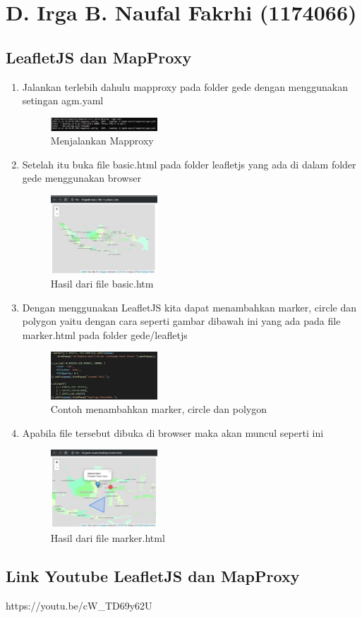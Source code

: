 \section{D. Irga B. Naufal Fakrhi (1174066)}
\subsection{LeafletJS dan MapProxy}
\begin{enumerate}
    \item Jalankan terlebih dahulu mapproxy pada folder gede dengan menggunakan setingan agm.yaml
        \hfill\break
        \begin{figure}[H]
        \includegraphics[width=4cm]{figures/tugas5/1174066/1.jpg}
        \centering
        \caption{Menjalankan Mapproxy}
        \end{figure}
    \item Setelah itu buka file basic.html pada folder leafletjs yang ada di dalam folder gede menggunakan browser
        \hfill\break
        \begin{figure}[H]
        \includegraphics[width=4cm]{figures/tugas5/1174066/3.jpg}
        \centering
        \caption{Hasil dari file basic.htm}
        \end{figure}
   \item Dengan menggunakan LeafletJS kita dapat menambahkan marker, circle dan polygon yaitu dengan cara seperti gambar dibawah ini yang ada pada file marker.html pada folder gede/leafletjs
        \hfill\break
        \begin{figure}[H]
        \includegraphics[width=4cm]{figures/tugas5/1174066/4.jpg}
        \centering
        \caption{Contoh menambahkan marker, circle dan polygon}
        \end{figure}
   \item Apabila file tersebut dibuka di browser maka akan muncul seperti ini
        \hfill\break
        \begin{figure}[H]
        \includegraphics[width=4cm]{figures/tugas5/1174066/5.jpg}
        \centering
        \caption{Hasil dari file marker.html}
        \end{figure}
\end{enumerate}
\subsection{Link Youtube LeafletJS dan MapProxy}
https://youtu.be/cW_TD69y62U
